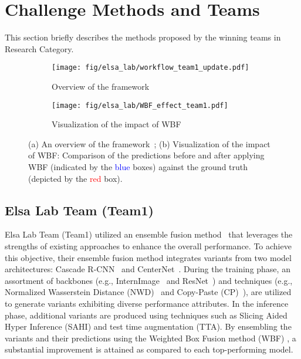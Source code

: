 \documentclass{mva_style}
\begin{document}
\section{Challenge Methods and Teams}

This section briefly describes the methods proposed by the winning teams in Research Category. 



\begin{figure*}[t]
    \centering
    \small
    \begin{subfigure}[b]{0.622\textwidth}
        \centering
        \texttt{[image: fig/elsa\_lab/workflow\_team1\_update.pdf]}
        \caption{Overview of the framework}
        \label{fig:workflow_team1}
    \end{subfigure}
    \hfill
    \begin{subfigure}[b]{0.35\textwidth}
        \centering
        \texttt{[image: fig/elsa\_lab/WBF\_effect\_team1.pdf]}
        \caption{Visualization of the impact of WBF}
        \label{fig:wbf_effect_team1}
    \end{subfigure}
    \caption{(a) An overview of the framework~\cite{team1_mva2023}; (b) Visualization of the impact of WBF: 
    Comparison of the predictions before and after applying WBF (indicated by the \textcolor{blue}{blue} boxes) against the ground truth (depicted by the \textcolor{red}{red} box).}
    \label{fig:overview_team1}
\end{figure*}

\subsection{Elsa Lab Team (Team1)}
Elsa Lab Team (Team1) utilized an ensemble fusion method~\cite{team1_mva2023} that leverages the strengths of existing approaches to enhance the overall performance. To achieve this objective, their ensemble fusion method integrates variants from two model architectures: Cascade R-CNN~\cite{cai2018cascade} and CenterNet~\cite{zhou2019objects}.
During the training phase, an assortment of backbones (e.g., InternImage~\cite{wang2023internimage} and ResNet~\cite{he2016deep}) and techniques (e.g., Normalized Wasserstein Distance (NWD)~\cite{wang2021normalized} and Copy-Paste (CP)~\cite{ghiasi2021simple}), are utilized to generate variants exhibiting diverse performance attributes. In the inference phase, additional variants are produced using techniques such as Slicing Aided Hyper Inference (SAHI) \cite{akyon2022slicing} and test time augmentation (TTA). By ensembling the variants and their predictions using the Weighted Box Fusion method (WBF) \cite{solovyev2021weighted}, a substantial improvement is attained as compared to each top-performing model.
\end{document}
